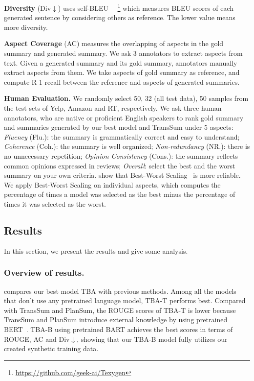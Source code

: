 \textbf{Diversity} (Div$\downarrow$) uses self-BLEU~\cite{SelfBleu18}
~\footnote{\url{https://github.com/geek-ai/Texygen}}
which measures BLEU scores of each generated sentence by considering others as reference. 
The lower value means more diversity.

\textbf{Aspect Coverage} (AC) measures the overlapping of aspects in the gold summary and generated summary.
We ask $3$ annotators to extract aspects from text. 
Given a generated summary and its gold summary,
annotators manually extract aspects from them.
We take aspects of gold summary as reference,
and compute R-1 recall between the reference  
and aspects of generated summaries.

\textbf{Human Evaluation.}
We randomly select 50, 32 (all test data), 50 samples 
from the test sets of Yelp, Amazon and RT, respectively. %
We ask three 
human annotators,
who are native or proficient English speakers to 
rank gold summary and summaries 
generated by our best model and TransSum under 5 aspects:
{\em Fluency} (Flu.): the summary is grammatically correct and easy to understand; {\em Coherence} (Coh.): the summary is well organized; {\em Non-redundancy} (NR.): there is no unnecessary repetition; {\em Opinion Consistency} (Cons.): the summary reflects common opinions expressed in reviews; {\em Overall}: select the best and the worst summary on your own criteria.
\citet{bestworst16} show that Best-Worst Scaling~\cite{bestworst} is more reliable.
We apply Best-Worst Scaling on individual aspects, which computes the percentage of times a model was selected as the best minus the percentage of times it was selected as the worst.



\subsection{Results}
\label{sec:results}
In this section, we present the results and give some analysis.

\subsubsection{Overview of results.}
 compares our best model TBA with previous methods.
Among all the models that don't use any pretrained language model, TBA-T performs best.
Compared with TransSum and PlanSum, the ROUGE scores of TBA-T is lower
because TransSum and PlanSum introduce external knowledge by using pretrained BERT~\cite{BERT19}.
TBA-B using pretrained BART achieves the best scores in terms of ROUGE, AC and Div$\downarrow$,
showing that our TBA-B model 
fully utilizes our created synthetic training data.

